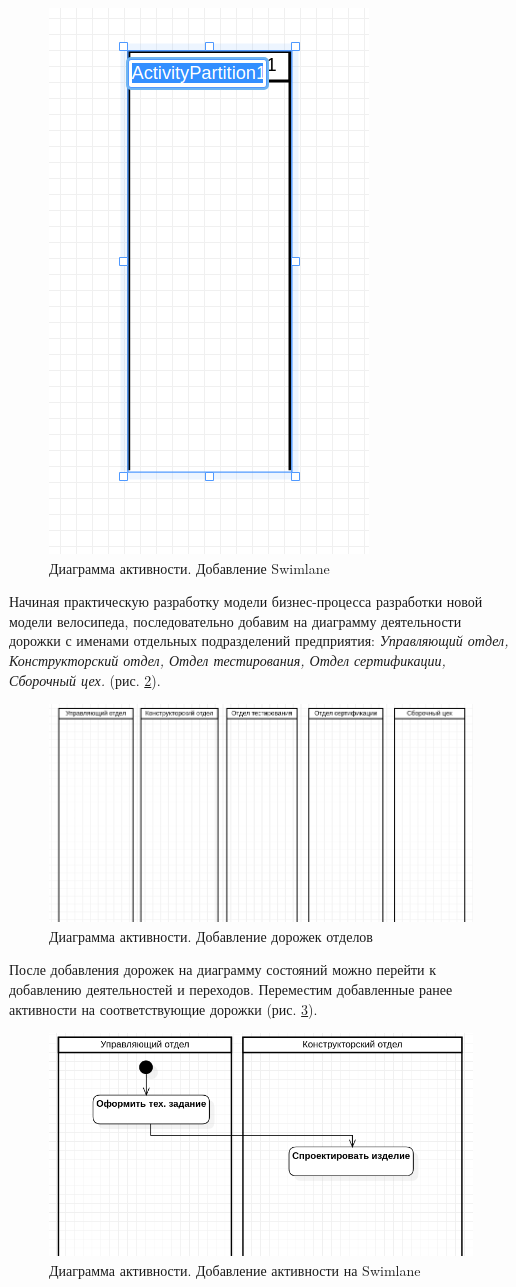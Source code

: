 \documentclass[a4paper,12pt]{extreport}
\begin{document}
\begin{figure}[h!]
	\centering
	\includegraphics[width=0.3\linewidth]{images/activityswimlane}
	\caption{Диаграмма активности. Добавление Swimlane}
	\label{fig:activityswimlane}
\end{figure}

Начиная практическую разработку модели бизнес-процесса разработки новой модели велосипеда, последовательно добавим на диаграмму деятельности дорожки с именами отдельных подразделений предприятия: \textit{Управляющий отдел, Конструкторский отдел, Отдел тестирования, Отдел сертификации, Сборочный цех.} (рис. \ref{fig:activityswimlaneall}).

\begin{figure}[h!]
	\centering
	\includegraphics[width=0.7\linewidth]{images/activityswimlaneall}
	\caption{Диаграмма активности. Добавление дорожек отделов}
	\label{fig:activityswimlaneall}
\end{figure}

После добавления дорожек на диаграмму состояний можно перейти к добавлению деятельностей и переходов. Переместим добавленные ранее активности на соответствующие дорожки (рис. \ref{fig:activityactivityonlane}).

\begin{figure}[h!]
	\centering
	\includegraphics[width=0.7\linewidth]{images/activityactivityonlane}
	\caption{Диаграмма активности. Добавление активности на Swimlane}
	\label{fig:activityactivityonlane}
\end{figure}
\end{document}
